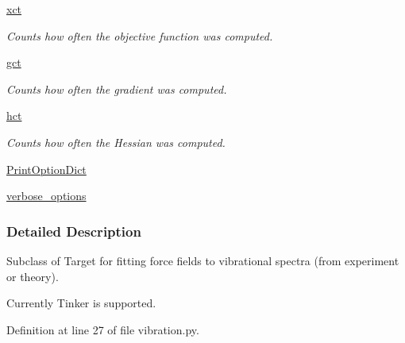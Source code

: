 \begin{DoxyCompactItemize}
\hyperlink{classforcebalance_1_1target_1_1Target_aad2e385cfbf7b4a68f1c2cb41133fe82}{xct}
\begin{DoxyCompactList}\small\item\em Counts how often the objective function was computed. \end{DoxyCompactList}\item 
\hyperlink{classforcebalance_1_1target_1_1Target_aa625ac88c6744eb14ef281d9496d0dbb}{gct}
\begin{DoxyCompactList}\small\item\em Counts how often the gradient was computed. \end{DoxyCompactList}\item 
\hyperlink{classforcebalance_1_1target_1_1Target_a5b5a42f78052b47f29ed4b940c6111a1}{hct}
\begin{DoxyCompactList}\small\item\em Counts how often the Hessian was computed. \end{DoxyCompactList}\item 
\hyperlink{classforcebalance_1_1baseclass_1_1ForceBalanceBaseClass_a5c55e661e746d1a4443f4e0bc34ebe05}{Print\-Option\-Dict}
\item 
\hyperlink{classforcebalance_1_1baseclass_1_1ForceBalanceBaseClass_a8088e1e20cbd6bc175fb9c9fe9fa0f18}{verbose\-\_\-options}
\end{DoxyCompactItemize}


\subsubsection{Detailed Description}
Subclass of Target for fitting force fields to vibrational spectra (from experiment or theory). 

Currently Tinker is supported. 

Definition at line 27 of file vibration.\-py.



